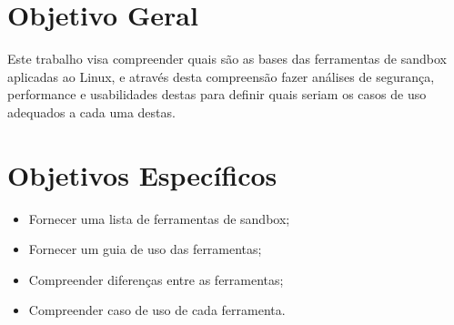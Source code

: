 \section*{Objetivo Geral}
Este trabalho visa compreender quais são as bases das ferramentas de sandbox aplicadas ao Linux, e através desta compreensão fazer análises de segurança, performance e usabilidades destas para definir quais seriam os casos de uso adequados a cada uma destas.

\section*{Objetivos Específicos}
\begin{itemize}
    \item Fornecer uma lista de ferramentas de sandbox;
    \item Fornecer um guia de uso das ferramentas;
    \item Compreender diferenças entre as ferramentas;
    \item Compreender caso de uso de cada ferramenta.
\end{itemize}
